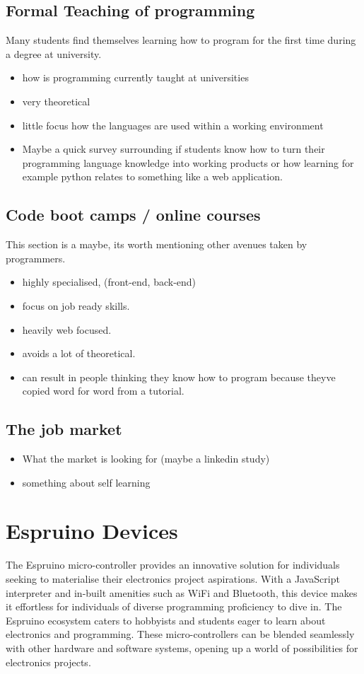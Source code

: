 \documentclass{l4proj}
\begin{document}
\subsection{Formal Teaching of programming}
Many students find themselves learning how to program for the first time during a degree at university.
\begin{itemize}
    \item how is programming currently taught at universities
    \item very theoretical
    \item little focus how the languages are used within a working environment
    \item Maybe a quick survey surrounding if students know how to turn their programming language knowledge into working products or how learning for example python relates to something like a web application.
\end{itemize}


\subsection{Code boot camps / online courses}
This section is a maybe, its worth mentioning other avenues taken by programmers.
\begin{itemize}
    \item highly specialised, (front-end, back-end) 
    \item focus on job ready skills.
    \item heavily web focused.
    \item avoids a lot of theoretical.
    \item can result in people thinking they know how to program because theyve copied word for word from a tutorial.
\end{itemize}

\subsection{The job market}
\begin{itemize}
    \item What the market is looking for (maybe a linkedin study)
    \item something about self learning
\end{itemize}

\section{Espruino Devices}
\text 
The Espruino micro-controller provides an innovative solution for individuals seeking to materialise their electronics project aspirations. With a JavaScript interpreter and in-built amenities such as WiFi and Bluetooth, this device makes it effortless for individuals of diverse programming proficiency to dive in. The Espruino ecosystem caters to hobbyists and students eager to learn about electronics and programming. These micro-controllers can be blended seamlessly with other hardware and software systems, opening up a world of possibilities for electronics projects.
\end{document}
